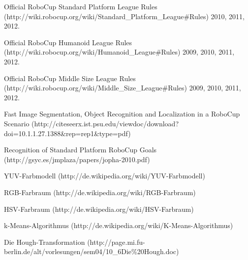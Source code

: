 \documentclass[a4paper,12pt]{article}
\begin{document}
\newpage

\begin{thebibliography}{9}

  Official RoboCup Standard Platform League Rules (http://wiki.robocup.org/wiki/Standard\_Platform\_League\#Rules)
  2010, 2011, 2012.

  Official RoboCup Humanoid League Rules (http://wiki.robocup.org/wiki/Humanoid\_League\#Rules)
  2009, 2010, 2011, 2012.  

  Official RoboCup Middle Size League Rules (http://wiki.robocup.org/wiki/Middle\_Size\_League\#Rules)
  2009, 2010, 2011, 2012.

  Fast Image Segmentation, Object Recognition and Localization in a RoboCup Scenario (http://citeseerx.ist.psu.edu/viewdoc/download?doi=10.1.1.27.1388\&rep=rep1\&type=pdf)

  Recognition of Standard Platform RoboCup Goals (http://gsyc.es/jmplaza/papers/jopha-2010.pdf)

  YUV-Farbmodell (http://de.wikipedia.org/wiki/YUV-Farbmodell)

  RGB-Farbraum (http://de.wikipedia.org/wiki/RGB-Farbraum)

  HSV-Farbraum (http://de.wikipedia.org/wiki/HSV-Farbraum)

  k-Means-Algorithmus (http://de.wikipedia.org/wiki/K-Means-Algorithmus)
  
  Die Hough-Transformation (http://page.mi.fu-berlin.de/alt/vorlesungen/sem04/10\_6Die\%20Hough.doc)

  
\end{thebibliography}
\end{document}
